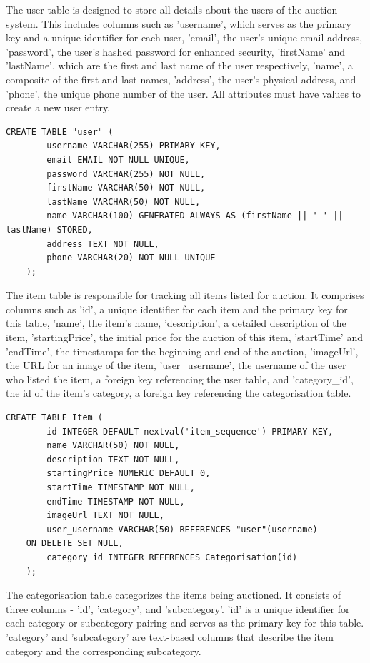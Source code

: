 The user table is designed to store all details about the users of the auction system. This includes columns such as 'username', which serves as the primary key and a unique identifier for each user, 'email', the user's unique email address, 'password', the user's hashed password for enhanced security, 'firstName' and 'lastName', which are the first and last name of the user respectively, 'name', a composite of the first and last names, 'address', the user's physical address, and 'phone', the unique phone number of the user. All attributes must have values to create a new user entry.

\begin{lstlisting}[style=sqlStyle]
	CREATE TABLE "user" (
		username VARCHAR(255) PRIMARY KEY,
		email EMAIL NOT NULL UNIQUE,
		password VARCHAR(255) NOT NULL,
		firstName VARCHAR(50) NOT NULL,
		lastName VARCHAR(50) NOT NULL,
		name VARCHAR(100) GENERATED ALWAYS AS (firstName || ' ' || lastName) STORED,
		address TEXT NOT NULL,
		phone VARCHAR(20) NOT NULL UNIQUE
	);
\end{lstlisting}

The item table is responsible for tracking all items listed for auction. It comprises columns such as 'id', a unique identifier for each item and the primary key for this table, 'name', the item's name, 'description', a detailed description of the item, 'startingPrice', the initial price for the auction of this item, 'startTime' and 'endTime', the timestamps for the beginning and end of the auction, 'imageUrl', the URL for an image of the item, 'user\_username', the username of the user who listed the item, a foreign key referencing the user table, and 'category\_id', the id of the item's category, a foreign key referencing the categorisation table.

\begin{lstlisting}[style=sqlStyle]
	CREATE TABLE Item (
		id INTEGER DEFAULT nextval('item_sequence') PRIMARY KEY,
		name VARCHAR(50) NOT NULL,
		description TEXT NOT NULL,
		startingPrice NUMERIC DEFAULT 0,
		startTime TIMESTAMP NOT NULL,
		endTime TIMESTAMP NOT NULL,
		imageUrl TEXT NOT NULL,
		user_username VARCHAR(50) REFERENCES "user"(username)
	ON DELETE SET NULL,
		category_id INTEGER REFERENCES Categorisation(id)
	);
\end{lstlisting}

The categorisation table categorizes the items being auctioned. It consists of three columns - 'id', 'category', and 'subcategory'. 'id' is a unique identifier for each category or subcategory pairing and serves as the primary key for this table. 'category' and 'subcategory' are text-based columns that describe the item category and the corresponding subcategory.

